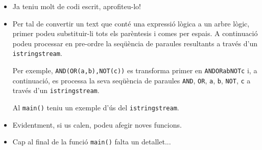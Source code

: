\begin{itemize}

    \item Ja teniu molt de codi escrit, aprofiteu-lo!

    \item

Per tal de convertir un text que conté una expressió lògica a un arbre lògic, primer podeu substituir-li tots els parèntesis i comes per espais.  A continuació podeu processar en pre-ordre la seqüència de paraules resultants a través d'un \texttt{istringstream}. 

Per exemple, \texttt{AND(OR(a,b),NOT(c))} es transforma primer en \texttt{AND\textvisiblespace{}OR\textvisiblespace{}a\textvisiblespace{}b\textvisiblespace{}\textvisiblespace{}NOT\textvisiblespace{}c\textvisiblespace{}\textvisiblespace{}} i, a continuació, es processa la seva seqüència de paraules \texttt{AND}, \texttt{OR}, \texttt{a}, \texttt{b}, \texttt{NOT}, \texttt{c} a través d'un \texttt{istringstream}.  

Al \texttt{main()} teniu un exemple d'ús del \texttt{istringstream}.

\item

Evidentment, si us calen, podeu afegir noves funcions.

\item

Cap al final de la funció \texttt{main()} falta un detallet...

\end{itemize}


\SampleTwoCol


